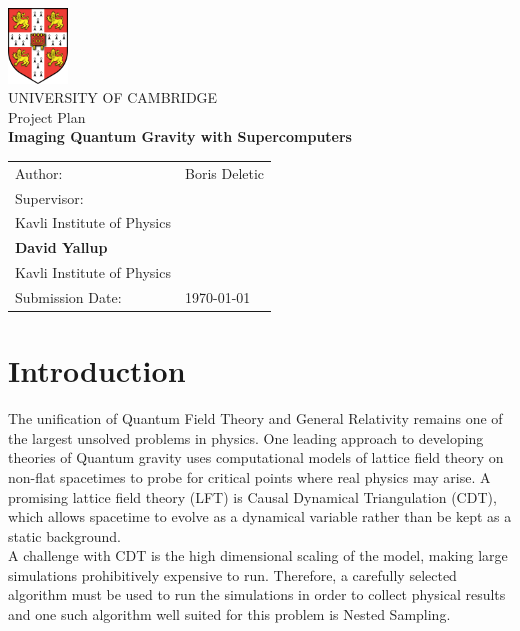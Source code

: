 \documentclass[a4paper]{article}
\newcommand{\getAuthor}{Boris Deletic}
\newcommand{\getDoctype}{Project Plan}
\newcommand{\getTitle}{Imaging Quantum Gravity with Supercomputers}
\newcommand{\getUniversity}{University of Cambridge}
\newcommand{\getSupervisor}{\textbf{Will Barker}\\
Kavli Institute of Physics\\[1em] 
\textbf{David Yallup}\\ 
Kavli Institute of Physics}
\newcommand{\getSubmissionDate}{\today}
\begin{document}
\begin{titlepage} 
    \centering 
    \includegraphics[height=20mm]{logo} {%
    \vspace*{20mm} }\\
    {\large\MakeUppercase{\getUniversity{}}}\\ 
    \vspace{20mm}
    {\Large \getDoctype{}}\\
    \vspace{15mm}
    {\huge\bfseries \getTitle{}}\\
    \vspace{15mm} 
    \begin{tabular}{l l} 
        Author: & \getAuthor{} \\[1em] 
        Supervisor: & \pbox[t]{5cm}{\getSupervisor{}} \\ 
        Submission Date: & \getSubmissionDate{} \\
    \end{tabular} 
  \end{titlepage}

  \section{Introduction}
        The unification of Quantum Field Theory and General Relativity
        remains one of the largest unsolved problems in physics. One
        leading approach to developing theories of Quantum gravity
        uses computational models of lattice field theory on non-flat
        spacetimes to probe for critical points where real physics may
        arise. A promising lattice field theory (LFT) is Causal
        Dynamical Triangulation (CDT), which allows spacetime to
        evolve as a dynamical variable rather than be kept as a static
        background. \\

    A challenge with CDT is the high dimensional scaling of the
    model, making large simulations prohibitively expensive to
    run. Therefore, a carefully selected algorithm must be used to run
    the simulations in order to collect physical results and one such
    algorithm well suited for this problem is Nested
    Sampling\cite{1}. \\
\end{document}
